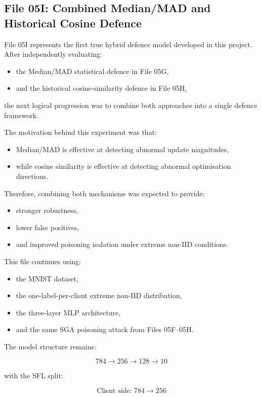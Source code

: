 \subsection*{File 05I: Combined Median/MAD and Historical Cosine Defence}

File 05I represents the first true hybrid defence model developed in this project. After independently evaluating:
\begin{itemize}
    \item the Median/MAD statistical defence in File 05G,
    \item and the historical cosine-similarity defence in File 05H,
\end{itemize}

the next logical progression was to combine both approaches into a single defence framework.

The motivation behind this experiment was that:
\begin{itemize}
    \item Median/MAD is effective at detecting abnormal update magnitudes,
    \item while cosine similarity is effective at detecting abnormal optimisation directions.
\end{itemize}

Therefore, combining both mechanisms was expected to provide:
\begin{itemize}
    \item stronger robustness,
    \item lower false positives,
    \item and improved poisoning isolation under extreme non-IID conditions.
\end{itemize}

This file continues using:
\begin{itemize}
    \item the MNIST dataset,
    \item the one-label-per-client extreme non-IID distribution,
    \item the three-layer MLP architecture,
    \item and the same SGA poisoning attack from Files 05F--05H.
\end{itemize}

The model structure remains:

\[
784 \rightarrow 256 \rightarrow 128 \rightarrow 10
\]

with the SFL split:

\[
\text{Client side: } 784 \rightarrow 256
\]

